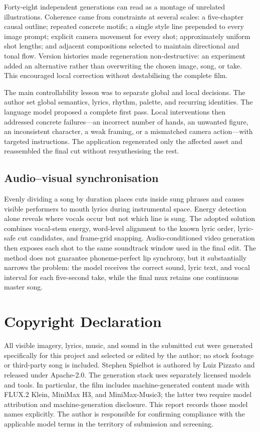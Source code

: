 \documentclass[sigconf]{acmart}
\begin{document}
Forty-eight independent generations can read as a montage of unrelated illustrations. Coherence came from constraints at several scales: a five-chapter causal outline; repeated concrete motifs; a single style line prepended to every image prompt; explicit camera movement for every shot; approximately uniform shot lengths; and adjacent compositions selected to maintain directional and tonal flow. Version histories made regeneration non-destructive: an experiment added an alternative rather than overwriting the chosen image, song, or take. This encouraged local correction without destabilising the complete film.

The main controllability lesson was to separate global and local decisions. The author set global semantics, lyrics, rhythm, palette, and recurring identities. The language model proposed a complete first pass. Local interventions then addressed concrete failures---an incorrect number of hands, an unwanted figure, an inconsistent character, a weak framing, or a mismatched camera action---with targeted instructions. The application regenerated only the affected asset and reassembled the final cut without resynthesising the rest.

\subsection{Audio--visual synchronisation}

Evenly dividing a song by duration places cuts inside sung phrases and causes visible performers to mouth lyrics during instrumental space. Energy detection alone reveals where vocals occur but not which line is sung. The adopted solution combines vocal-stem energy, word-level alignment to the known lyric order, lyric-safe cut candidates, and frame-grid snapping. Audio-conditioned video generation then exposes each shot to the same soundtrack window used in the final edit. The method does not guarantee phoneme-perfect lip synchrony, but it substantially narrows the problem: the model receives the correct sound, lyric text, and vocal interval for each five-second take, while the final mux retains one continuous master song.

\section{Copyright Declaration}

All visible imagery, lyrics, music, and sound in the submitted cut were generated specifically for this project and selected or edited by the author; no stock footage or third-party song is included. Stephen Spielbot is authored by Luiz Pizzato and released under Apache-2.0. The generation stack uses separately licensed models and tools. In particular, the film includes machine-generated content made with FLUX.2 Klein, MiniMax H3, and MiniMax-Music3; the latter two require model attribution and machine-generation disclosure. This report records those model names explicitly. The author is responsible for confirming compliance with the applicable model terms in the territory of submission and screening.
\end{document}
